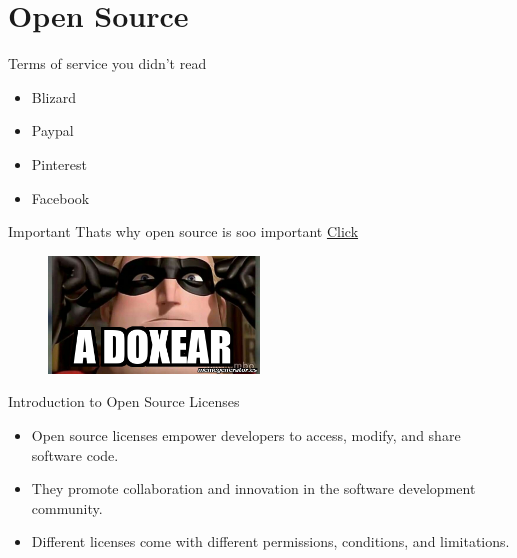 \documentclass[10pt]{beamer}
\begin{document}
\section{Open Source}
    \begin{frame}{Terms of service you didn't read }
      \begin{itemize}
        \item Blizard
        \item Paypal
        \item Pinterest
        \item Facebook
      \end{itemize}
      \begin{alertblock}{Important}
        Thats why open source is soo important \newline
        \href{https://tosdr.org/}{Click}
      \end{alertblock}
      \begin{figure}[h]
        \centering
        \includegraphics[width=0.5\textwidth]{figures/DoxingMeme.jpg}
        \label{fig:my_label}
        \end{figure}
    \end{frame}

    \begin{frame}{Introduction to Open Source Licenses}
      \begin{itemize}
          \item Open source licenses empower developers to access, modify, and share software code.
          \item They promote collaboration and innovation in the software development community.
          \item Different licenses come with different permissions, conditions, and limitations.
      \end{itemize}
  \end{frame}
\end{document}
